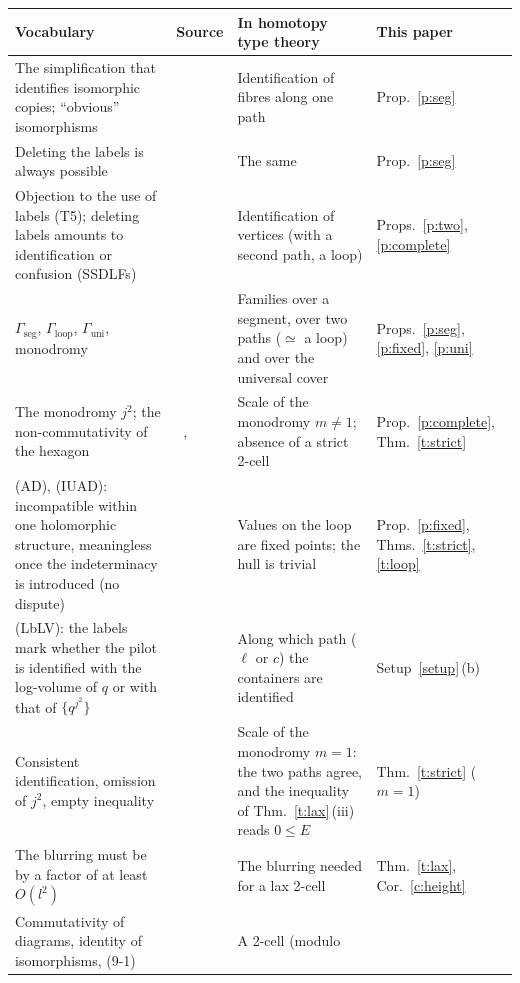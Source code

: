 \documentclass[11pt,a4paper]{article}
\newcommand{\Gseg}{\Gamma_{\mathrm{seg}}}
\newcommand{\Gloop}{\Gamma_{\mathrm{loop}}}
\newcommand{\Guni}{\Gamma_{\mathrm{uni}}}
\newcommand{\lab}[2]{{\upshape\fcolorbox{#1}{#1!8}{\scriptsize\sffamily\bfseries\textcolor{#1}{#2}}}}
\newcommand{\tagS}{\lab{blue}{S}}
\newcommand{\tagX}{\lab{Plum}{X}}
\newcommand{\q}[1]{``#1''}
\theoremstyle{plain}
\theoremstyle{definition}
\theoremstyle{remark}
\begin{document}
{\footnotesize
\begin{longtable}{@{}>{\raggedright\arraybackslash}p{4.2cm}>{\raggedright\arraybackslash}p{3.1cm}>{\raggedright\arraybackslash}p{4.3cm}>{\raggedright\arraybackslash}p{2.5cm}@{}}
\toprule
Vocabulary & Source & In homotopy type theory & This paper\\
\midrule
\endhead
The simplification that identifies isomorphic copies; \q{obvious} isomorphisms & \tagX\ \cite[\S2.1, footnote~8]{SS}
& Identification of fibres along one path & Prop.~\ref{p:seg}\\
Deleting the labels is always possible & \tagS\ \cite[Ex.~2.4.8\,(iv-c)]{Ess} & The same & Prop.~\ref{p:seg}\\
Objection to the use of labels (T5); deleting labels amounts to identification or confusion (SSDLFs) & \tagS\
\cite[(T5) of \S4, (SSDLFs)]{R18} & Identification of vertices (with a second path, a loop) &
Props.~\ref{p:two}, \ref{p:complete}\\
$\Gseg$, $\Gloop$, $\Guni$, monodromy & \tagS\ \cite[(LbEx1)]{R18} & Families over a segment, over two paths
($\simeq$ a loop) and over the universal cover & Props.~\ref{p:seg}, \ref{p:fixed}, \ref{p:uni}\\
The monodromy $j^2$; the non-commutativity of the hexagon & \tagX\ \cite[\S2.2]{SS}, \cite[\S10.2]{LANA} & Scale of
the monodromy $m\ne1$; absence of a strict 2-cell & Prop.~\ref{p:complete}, Thm.~\ref{t:strict}\\
(AD), (IUAD): incompatible within one holomorphic structure, meaningless once the indeterminacy is introduced (no
dispute) & \tagS\ \cite{R18} & Values on the loop are fixed points; the hull is trivial & Prop.~\ref{p:fixed},
Thms.~\ref{t:strict}, \ref{t:loop}\\
(LbLV): the labels mark whether the pilot is identified with the log-volume of $q$ or with that of $\{q^{j^2}\}$ &
\tagS\ \cite{R18} & Along which path ($\ell$ or $c$) the containers are identified & Setup~\ref{setup}\,(b)\\
Consistent identification, omission of $j^2$, empty inequality & \tagX\ \cite[\S2.2]{SS} & Scale of the monodromy
$m=1$: the two paths agree, and the inequality of Thm.~\ref{t:lax}\,(iii) reads $0\le E$ & Thm.~\ref{t:strict}
($m=1$)\\
The blurring must be by a factor of at least $O(l^2)$ & \tagX\ \cite[\S2.2]{SS} & The blurring needed for a lax 2-cell &
Thm.~\ref{t:lax}, Cor.~\ref{c:height}\\
Commutativity of diagrams, identity of isomorphisms, (9-1) & \tagX\ \cite[\S0.2, \S9.2]{LANA} & A 2-cell (modulo

\end{longtable}}
\end{document}
